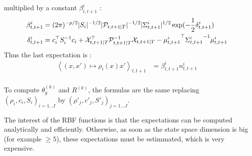 multiplied by a constant $\beta^{i}_{t,t+1}$ :
\begin{align*}
  \beta^i_{t,t+1} &= (2\pi)^{-p/2} |S_i|^{-1/2} |\mathcal{P}_{t,t+1 \mathbin{\vert} T}|^{-1/2} |\Sigma^i_{t,t+1}|^{1/2} \exp(-\frac{1}{2} \delta^i_{t,t+1})\\
  \delta^i_{t,t+1} &=
    c_i^{\top} S_i^{-1} c_i +
    \mathcal{X}_{t,t+1 \mathbin{\vert} T}^{\top} \mathcal{P}_{t,t+1 \mathbin{\vert} T}^{-1} \mathcal{X}_{t,t+1 \mathbin{\vert} T} - {\mu^i_{t,t+1}}^{\top} {\Sigma^i_{t,t+1}}^{-1} \mu^i_{t,t+1}\\
\end{align*}
Thus the last expectation is :
\begin{align*}
  \left< (x,x') \mapsto \rho_i(x) x' \right>_{t,t+1} &= \beta^i_{t,t+1}n^i_{t,t+1}\\
\end{align*}

To compute $\theta_g^{(k)}$ and $R^{(k)}$, the formulas are the same replacing $(\rho_i, c_i, S_i)_{i=1 \ldots I}$ by $(\rho'_j, c'_j, S'_j)_{j=1 \ldots J}$.

The interest of the RBF functions is that the expectations can be computed analytically and efficiently.
Otherwise, as soon as the state space dimension is big (for example $\geq 5$), these expectations must be estimmated, which is very expensive.
